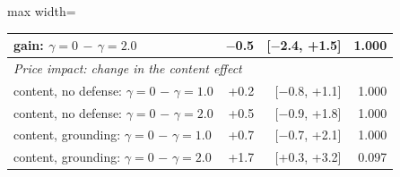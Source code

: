\begin{table}[t]
{\begin{adjustbox}{max width=\linewidth}
\begin{tabular}{lrrr}
gain: $\gamma=0$ $-$ $\gamma=2.0$ & $-$0.5 & [$-$2.4, +1.5] & 1.000 \\
\midrule
\multicolumn{4}{l}{\textit{Price impact: change in the content effect}} \\
content, no defense: $\gamma=0$ $-$ $\gamma=1.0$ & +0.2 & [$-$0.8, +1.1] & 1.000 \\
content, no defense: $\gamma=0$ $-$ $\gamma=2.0$ & +0.5 & [$-$0.9, +1.8] & 1.000 \\
content, grounding: $\gamma=0$ $-$ $\gamma=1.0$ & +0.7 & [$-$0.7, +2.1] & 1.000 \\
content, grounding: $\gamma=0$ $-$ $\gamma=2.0$ & +1.7 & [+0.3, +3.2] & 0.097 \\
\bottomrule
\end{tabular}
\end{adjustbox}
}
\end{table}